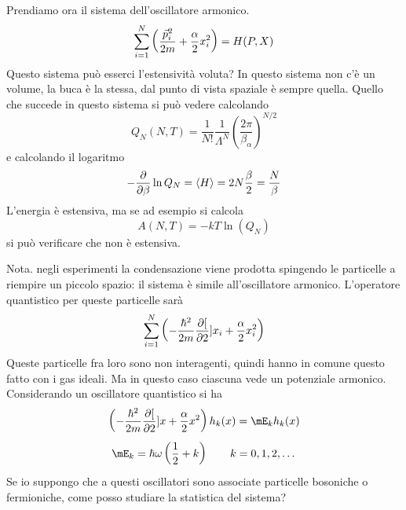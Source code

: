 \documentclass[../MeccanicaStatistica.tex]{subfiles}
\begin{document}
Prendiamo ora il sistema dell'oscillatore armonico.
\[
\sum_{i = 1}^N \left(\frac{\vec p_i^2}{2 m} + \frac{\alpha}{2} x_i^2 \right) = H(P,X)
\]
Questo sistema può esserci l'estensività voluta? In questo sistema non c'è un volume, la buca è la stessa, dal punto di vista spaziale è sempre quella. Quello che succede in questo sistema si può vedere calcolando
\[
Q_N(N,T) = \frac{1}{N!} \frac{1}{\Lambda^N} \left(\frac{2 \pi}{\beta_{\alpha}}\right)^{N/2}
\]
e calcolando il logaritmo
\[
- \frac{\partial }{\partial \beta} \ln Q_N = \left\langle{H}\right\rangle = 2 N \frac{\beta}{2} = \frac{N}{\beta}
\]
L'energia è estensiva, ma se ad esempio si calcola
\[
A(N,T) = - k T \ln(Q_N)
\]
si può verificare che non è estensiva.

Nota. negli esperimenti la condensazione viene prodotta spingendo le particelle a riempire un piccolo spazio: il sistema è simile all'oscillatore armonico. L'operatore quantistico per queste particelle sarà
\[
\sum_{i = 1}^N \left(- \frac{\hbar^2}{2m} \frac{\partial [}{\partial 2}]{}{x_i} + \frac{\alpha}{2} x_i^2\right)
\]
Queste particelle fra loro sono non interagenti, quindi hanno in comune questo fatto con i gas ideali. Ma in questo caso ciascuna vede un potenziale armonico. Considerando un oscillatore quantistico si ha
\[
\left(- \frac{\hbar^2}{2m} \pderiv[2]{}{x} + \frac{\alpha}{2} x^2 \right) h_k(x) = \mE_k h_k(x)
\]
\[
\mE_k = \hbar \omega \left(\frac{1}{2} + k\right) \qquad k = 0, 1, 2, \dots
\]
Se io suppongo che a questi oscillatori sono associate particelle bosoniche o fermioniche, come posso studiare la statistica del sistema?
\end{document}
